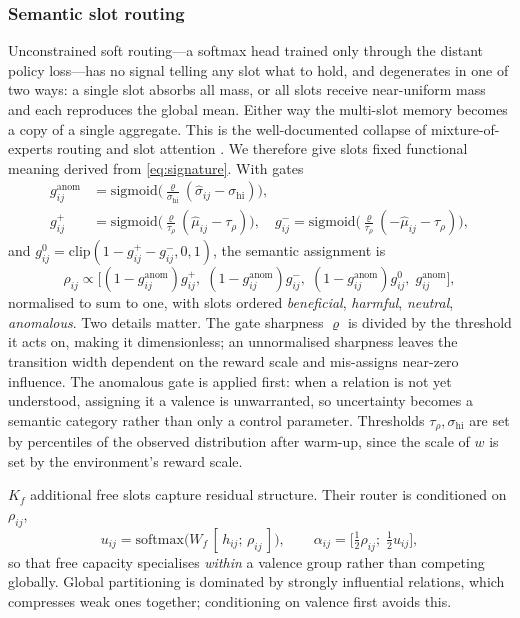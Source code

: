 \documentclass[conference]{IEEEtran}
\begin{document}
\subsubsection{Semantic slot routing}
Unconstrained soft routing---a softmax head trained only through the distant policy loss---has no signal telling any slot what to hold, and degenerates in one of two ways: a single slot absorbs all mass, or all slots receive near-uniform mass and each reproduces the global mean. Either way the multi-slot memory becomes a copy of a single aggregate. This is the well-documented collapse of mixture-of-experts routing and slot attention \cite{fedus2022switch, locatello2020slotattention}. We therefore give slots fixed functional meaning derived from \eqref{eq:signature}. With gates
\begin{align}
g^{\mathrm{anom}}_{ij}&=\mathrm{sigmoid}\!\big(\tfrac{\varrho}{\sigma_{\mathrm{hi}}}(\hat\sigma_{ij}-\sigma_{\mathrm{hi}})\big), \label{eq:gate_anom}\\
g^{+}_{ij}&=\mathrm{sigmoid}\!\big(\tfrac{\varrho}{\tau_\rho}(\hat\mu_{ij}-\tau_\rho)\big),\quad
g^{-}_{ij}=\mathrm{sigmoid}\!\big(\tfrac{\varrho}{\tau_\rho}(-\hat\mu_{ij}-\tau_\rho)\big), \label{eq:gate_pm}
\end{align}
and $g^{0}_{ij}=\mathrm{clip}(1-g^{+}_{ij}-g^{-}_{ij},0,1)$, the semantic assignment is
\begin{equation}
\rho_{ij}\propto\Big[(1-g^{\mathrm{anom}}_{ij})g^{+}_{ij},\;(1-g^{\mathrm{anom}}_{ij})g^{-}_{ij},\;(1-g^{\mathrm{anom}}_{ij})g^{0}_{ij},\;g^{\mathrm{anom}}_{ij}\Big],
\label{eq:rho}
\end{equation}
normalised to sum to one, with slots ordered \emph{beneficial}, \emph{harmful}, \emph{neutral}, \emph{anomalous}. Two details matter. The gate sharpness $\varrho$ is divided by the threshold it acts on, making it dimensionless; an unnormalised sharpness leaves the transition width dependent on the reward scale and mis-assigns near-zero influence. The anomalous gate is applied first: when a relation is not yet understood, assigning it a valence is unwarranted, so uncertainty becomes a semantic category rather than only a control parameter. Thresholds $\tau_\rho,\sigma_{\mathrm{hi}}$ are set by percentiles of the observed distribution after warm-up, since the scale of $w$ is set by the environment's reward scale.

$K_f$ additional free slots capture residual structure. Their router is conditioned on $\rho_{ij}$,
\begin{equation}
u_{ij}=\mathrm{softmax}\!\big(W_f\,[\,h_{ij};\,\rho_{ij}\,]\big),
\qquad
\alpha_{ij}=\big[\tfrac12\rho_{ij};\;\tfrac12 u_{ij}\big],
\label{eq:free_slots}
\end{equation}
so that free capacity specialises \emph{within} a valence group rather than competing globally. Global partitioning is dominated by strongly influential relations, which compresses weak ones together; conditioning on valence first avoids this.
\end{document}
